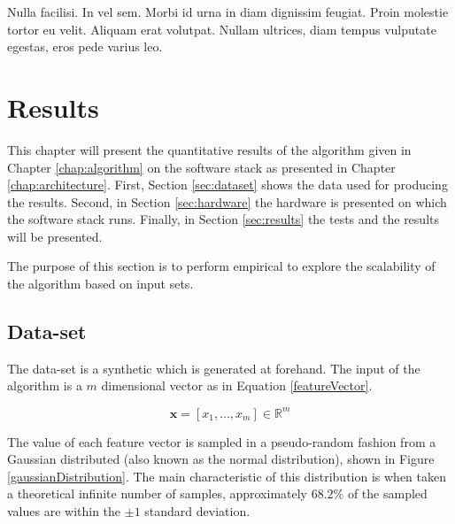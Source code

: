 \begin{savequote}[75mm] 
Nulla facilisi. In vel sem. Morbi id urna in diam dignissim feugiat. Proin molestie tortor eu velit. Aliquam erat volutpat. Nullam ultrices, diam tempus vulputate egestas, eros pede varius leo.
\end{savequote}

\chapter{Results \label{chap:results}}

This chapter will present the quantitative results of the algorithm given in Chapter \ref{chap:algorithm} on the software stack as presented in Chapter \ref{chap:architecture}. First, Section \ref{sec:dataset} shows the data used for producing the results. Second, in Section \ref{sec:hardware} the hardware is presented on which the software stack runs. Finally, in Section \ref{sec:results} the tests and the results will be presented.

The purpose of this section is to perform empirical to explore the scalability of the algorithm based on input sets.

\section{Data-set \label{sec:dataset}}

The data-set is a synthetic which is generated at forehand. The input of the algorithm is a $m$ dimensional vector as in Equation \ref{featureVector}.

\begin{equation}
\textbf{x} = [x_{1},\ldots,x_{m}] \in \mathbb{R}^{m} \label{featureVector}
\end{equation}

The value of each feature vector is sampled in a pseudo-random fashion from a Gaussian distributed (also known as the normal distribution), shown in Figure \ref{gaussianDistribution}. The main characteristic of this distribution is when taken a theoretical infinite number of samples, approximately $68.2\%$ of the sampled values are within the $\pm 1$ standard deviation.

